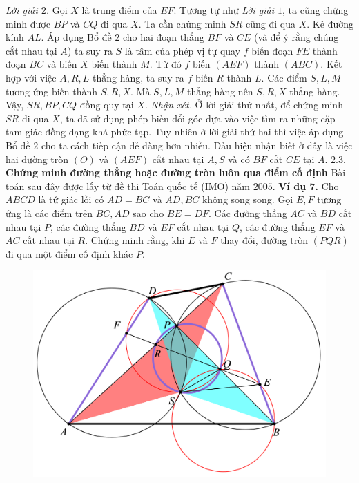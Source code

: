 \begin{multicols}{2}
	\vskip 0.1cm
	\textit{Lời giải $2$.} Gọi $X$ là trung điểm của $EF$. Tương tự như \textit{Lời giải $1$}, ta cũng chứng minh được $BP$ và $CQ$ đi qua $X$. Ta cần chứng minh $SR$ cũng đi qua $X$. Kẻ đường kính $AL$. Áp dụng Bổ đề $2$ cho hai đoạn thẳng $BF$ và $CE$ (và để ý rằng chúng cắt nhau tại $A$) ta suy ra $S$ là tâm của phép vị tự quay $f$ biến đoạn $FE$ thành đoạn $BC$ và biến $X$ biến thành $M$. Từ đó $f$ biến $(AEF)$ thành $(ABC)$. Kết hợp với việc $A,R,L$ thẳng hàng, ta suy ra $f$ biến $R$ thành $L$. Các điểm $S,L,M$ tương ứng biến thành $S,R,X$. Mà  $S,L,M$ thẳng hàng nên $S,R,X$ thẳng hàng. Vậy, $SR,BP,CQ$ đồng quy tại $X$.
	\vskip 0.1cm
	\textit{Nhận xét.} Ở lời giải thứ nhất, để chứng minh $SR$ đi qua $X$, ta đã sử dụng phép biến đổi góc dựa vào việc tìm ra những cặp tam giác đồng dạng khá phức tạp. Tuy nhiên ở lời giải thứ hai thì việc áp dụng Bổ đề $2$ cho ta cách tiếp cận dễ dàng hơn nhiều. Dấu hiệu nhận biết ở đây là việc hai đường tròn $(O)$ và $(AEF)$ cắt nhau tại $ A,S$ và có $BF$ cắt $CE$ tại $A$.
	\vskip 0.1cm 
	$\pmb{2.3.}$ \textbf{\color{hoccungpi} Chứng minh đường thẳng hoặc đường tròn luôn qua điểm cố định}
	\vskip 0.1cm
	Bài toán sau đây được lấy từ đề thi Toán quốc tế (IMO) năm $2005$.
	\vskip 0.1cm
	\textbf{\color{hoccungpi}Ví dụ $\pmb{7}$.} Cho $ABCD$ là tứ giác lồi có $AD=BC$ và $AD,BC$ không song song. Gọi $E,F$ tương ứng  là các điểm trên $BC,AD$ sao cho $BE=DF$. Các đường thẳng  $AC$ và $BD$ cắt nhau tại $P$, các đường thẳng $BD$ và $EF$ cắt nhau tại $Q$, các đường thẳng $EF$ và $AC$ cắt nhau tại $R$. Chứng minh rằng, khi $E$ và $F$ thay đổi, đường tròn $(PQR)$ đi qua một điểm cố định khác $P$.
	\begin{figure}[H]
		\vspace*{-5pt}
		\centering
		\captionsetup{labelformat= empty, justification=centering}
		\includegraphics[width= 1.02\linewidth]{14}

\end{figure}
\end{multicols}
